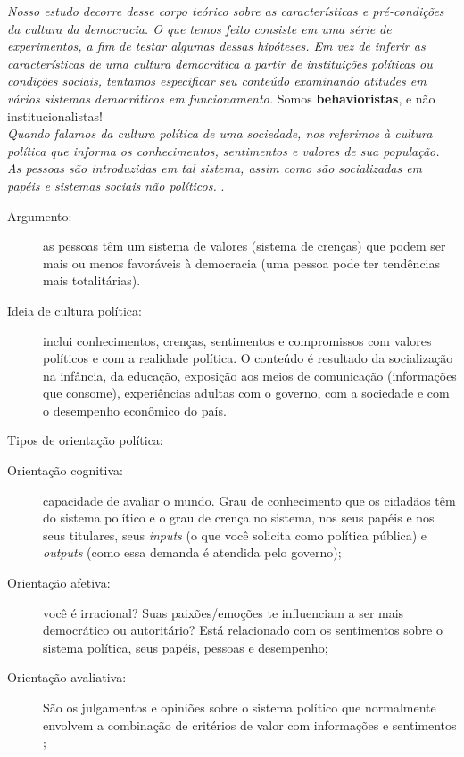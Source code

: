 \noindent \textit{Nosso estudo decorre desse corpo teórico sobre as características e pré-condições da cultura da democracia. O que temos feito consiste em uma série de experimentos, a fim de testar algumas dessas hipóteses. Em vez de inferir as características de uma cultura democrática a partir de instituições políticas ou condições sociais, tentamos especificar seu conteúdo examinando atitudes em vários sistemas democráticos em funcionamento.} Somos \textbf{behavioristas}, e não institucionalistas! \\

\noindent \textit{Quando falamos da cultura política de uma sociedade, nos referimos à cultura política que informa os conhecimentos, sentimentos e valores de sua população. As pessoas são introduzidas em tal sistema, assim como são socializadas em papéis e sistemas sociais não políticos.} \cite[~p. 30]{almond_1970}. \\

\begin{description}
    \item [Argumento:] as pessoas têm um sistema de valores (sistema de crenças) que podem ser mais ou menos favoráveis à democracia (uma pessoa pode ter tendências mais totalitárias). 

    \item [Ideia de cultura política:] inclui conhecimentos, crenças, sentimentos e compromissos com valores políticos e com a realidade política. O conteúdo é resultado da socialização na infância, da educação, exposição aos meios de comunicação (informações que consome), experiências adultas com o governo, com a sociedade e com o desempenho econômico do país.
\end{description}

\noindent Tipos de orientação política:

\begin{description}
    \item [Orientação cognitiva:] capacidade de avaliar o mundo. Grau de conhecimento que os cidadãos têm do sistema político e o grau de crença no sistema, nos seus papéis e nos seus titulares, seus \textit{inputs} (o que você solicita como política pública) e \textit{outputs} (como essa demanda é atendida pelo governo);
    \item [Orientação afetiva:] você é irracional? Suas paixões/emoções te influenciam a ser mais democrático ou autoritário? Está relacionado com os sentimentos sobre o sistema política, seus papéis, pessoas e desempenho;
    \item [Orientação avaliativa:] São os julgamentos e opiniões sobre o sistema político que normalmente envolvem a combinação de critérios de valor com informações e sentimentos \cite[~p. 31]{almond_1970};
\end{description}

